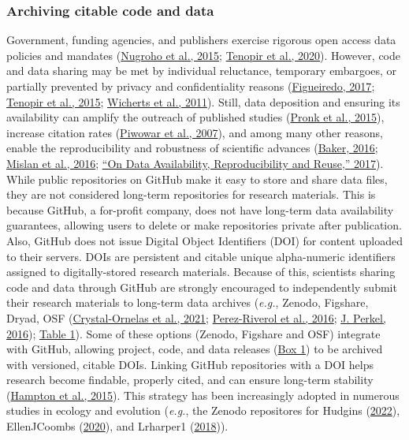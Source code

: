 \hypertarget{archiving-citable-code}{%
\subsubsection{Archiving citable code and data}\label{archiving-citable-code}}

Government, funding agencies, and publishers exercise rigorous open access data policies and mandates (\protect\hyperlink{ref-1Hcf13Q0k}{Nugroho et al., 2015}; \protect\hyperlink{ref-PLmDFZrm}{Tenopir et al., 2020}).
However, code and data sharing may be met by individual reluctance, temporary embargoes, or partially prevented by privacy and confidentiality reasons (\protect\hyperlink{ref-SLq38RVv}{Figueiredo, 2017}; \protect\hyperlink{ref-1CzUZwyU2}{Tenopir et al., 2015}; \protect\hyperlink{ref-1Ch6LSHef}{Wicherts et al., 2011}).
Still, data deposition and ensuring its availability can amplify the outreach of published studies (\protect\hyperlink{ref-666HppfO}{Pronk et al., 2015}), increase citation rates (\protect\hyperlink{ref-1CcAUn3Lu}{Piwowar et al., 2007}), and among many other reasons, enable the reproducibility and robustness of scientific advances (\protect\hyperlink{ref-1HZdsK5Kn}{Baker, 2016}; \protect\hyperlink{ref-uBJwnPbq}{Mislan et al., 2016}; \protect\hyperlink{ref-4LaijDIZ}{{``On Data Availability, Reproducibility and Reuse,''} 2017}).
While public repositories on GitHub make it easy to store and share data files, they are not considered long-term repositories for research materials.
This is because GitHub, a for-profit company, does not have long-term data availability guarantees, allowing users to delete or make repositories private after publication.
Also, GitHub does not issue Digital Object Identifiers (DOI) for content uploaded to their servers.
DOIs are persistent and citable unique alpha-numeric identifiers assigned to digitally-stored research materials.
Because of this, scientists sharing code and data through GitHub are strongly encouraged to independently submit their research materials to long-term data archives (\emph{e.g.}, Zenodo, Figshare, Dryad, OSF (\protect\hyperlink{ref-1Du6fzB8g}{Crystal‐Ornelas et al., 2021}; \protect\hyperlink{ref-kEX5dgzK}{Perez-Riverol et al., 2016}; \protect\hyperlink{ref-10ghgV3S8}{J. Perkel, 2016}); \protect\hyperlink{tbl:compare}{Table 1}).
Some of these options (Zenodo, Figshare and OSF) integrate with GitHub, allowing project, code, and data releases (\protect\hyperlink{definitions}{Box 1}) to be archived with versioned, citable DOIs.
Linking GitHub repositories with a DOI helps research become findable, properly cited, and can ensure long-term stability (\protect\hyperlink{ref-iIEKCTLU}{Hampton et al., 2015}).
This strategy has been increasingly adopted in numerous studies in ecology and evolution (\emph{e.g.}, the Zenodo repositores for Hudgins (\protect\hyperlink{ref-GQj3c17f}{2022}), EllenJCoombs (\protect\hyperlink{ref-bZNn2hbh}{2020}), and Lrharper1 (\protect\hyperlink{ref-ZI1OqZNr}{2018})).


